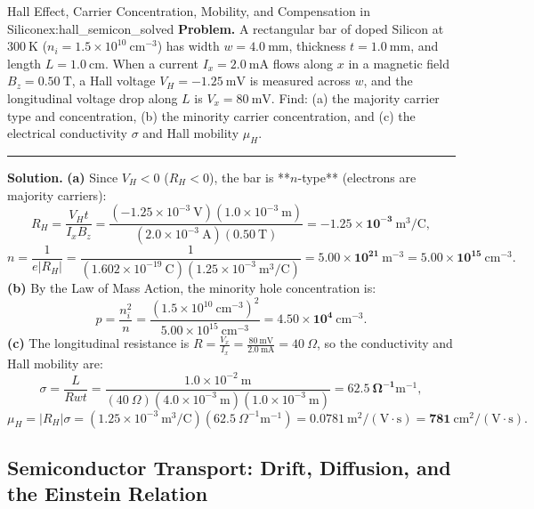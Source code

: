 \documentclass[11pt,a4paper]{article}
\newcommand{\abs}[1]{\left|#1\right|}
\begin{document}
\begin{examplebox}{Hall Effect, Carrier Concentration, Mobility, and Compensation in Silicon}{ex:hall_semicon_solved}
\textbf{Problem.} A rectangular bar of doped Silicon at $300\ \mathrm{K}$ ($n_i = 1.5\times 10^{10}\ \mathrm{cm^{-3}}$) has width $w = 4.0\ \mathrm{mm}$, thickness $t = 1.0\ \mathrm{mm}$, and length $L = 1.0\ \mathrm{cm}$. When a current $I_x = 2.0\ \mathrm{mA}$ flows along $x$ in a magnetic field $B_z = 0.50\ \mathrm{T}$, a Hall voltage $V_H = -1.25\ \mathrm{mV}$ is measured across $w$, and the longitudinal voltage drop along $L$ is $V_x = 80\ \mathrm{mV}$. Find: (a) the majority carrier type and concentration, (b) the minority carrier concentration, and (c) the electrical conductivity $\sigma$ and Hall mobility $\mu_H$.
\vspace{0.2cm}\hrule\vspace{0.2cm}
\textbf{Solution.}
\textbf{(a)} Since $V_H < 0$ ($R_H < 0$), the bar is **$n$-type** (electrons are majority carriers):
\[
    R_H = \frac{V_H t}{I_x B_z} = \frac{(-1.25\times 10^{-3}\ \mathrm{V})(1.0\times 10^{-3}\ \mathrm{m})}{(2.0\times 10^{-3}\ \mathrm{A})(0.50\ \mathrm{T})} = \mathbf{-1.25\times 10^{-3}\ \mathrm{m^3/C}},
\]
\[
    n = \frac{1}{e\abs{R_H}} = \frac{1}{(1.602\times 10^{-19}\ \mathrm{C})(1.25\times 10^{-3}\ \mathrm{m^3/C})} = \mathbf{5.00\times 10^{21}\ \mathrm{m^{-3}} = 5.00\times 10^{15}\ \mathrm{cm^{-3}}}.
\]
\textbf{(b)} By the Law of Mass Action, the minority hole concentration is:
\[
    p = \frac{n_i^2}{n} = \frac{(1.5\times 10^{10}\ \mathrm{cm^{-3}})^2}{5.00\times 10^{15}\ \mathrm{cm^{-3}}} = \mathbf{4.50\times 10^{4}\ \mathrm{cm^{-3}}}.
\]
\textbf{(c)} The longitudinal resistance is $R = \frac{V_x}{I_x} = \frac{80\ \mathrm{mV}}{2.0\ \mathrm{mA}} = 40\ \Omega$, so the conductivity and Hall mobility are:
\[
    \sigma = \frac{L}{R w t} = \frac{1.0\times 10^{-2}\ \mathrm{m}}{(40\ \Omega)(4.0\times 10^{-3}\ \mathrm{m})(1.0\times 10^{-3}\ \mathrm{m})} = \mathbf{62.5\ \Omega^{-1}\mathrm{m^{-1}}},
\]
\[
    \mu_H = \abs{R_H}\sigma = (1.25\times 10^{-3}\ \mathrm{m^3/C})(62.5\ \Omega^{-1}\mathrm{m^{-1}}) = \mathbf{0.0781\ \mathrm{m^2/(V\cdot s)} = 781\ \mathrm{cm^2/(V\cdot s)}}.
\]
\end{examplebox}

\subsection{Semiconductor Transport: Drift, Diffusion, and the Einstein Relation}
\label{subsec:semi_transport}
\end{document}

